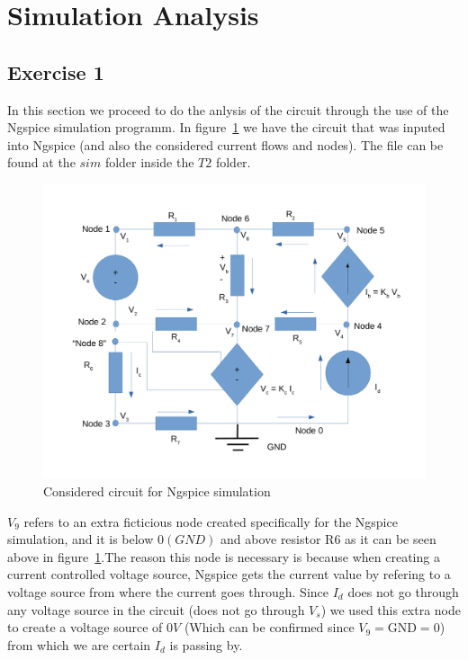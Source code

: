 \newpage
\section{Simulation Analysis}
\label{sec:simulation}


\subsection{Exercise 1}
\label{Exercise 1}

In this section we proceed to do the anlysis of the circuit through the use of the Ngspice simulation programm. In figure~\ref{fig:circuit_simulation} we have the circuit that was inputed into Ngspice (and also the considered current flows and nodes). The file can be found at the $sim$ folder inside the $T2$ folder.

\begin{figure}[!ht] \centering
\includegraphics[width=0.8\linewidth]{circuit_simulation.pdf}
\caption{Considered circuit for Ngspice simulation}
\label{fig:circuit_simulation}
\end{figure}

$V_9$ refers to an extra ficticious node created specifically for the Ngspice simulation, and it is below $0(GND)$ and above resistor R6 as it can be seen above in figure~\ref{fig:circuit_simulation}.The reason this node is necessary is because when creating a current controlled voltage source, Ngspice gets the current value by refering to a voltage source from where the current goes through. Since $I_d$ does not go through any voltage source in the circuit (does not go through $V_s$) we used this extra node to create a voltage source of 0$V$ (Which can be confirmed since $V_9 = $GND$ = 0$) from which we are certain $I_d$ is passing by. 

